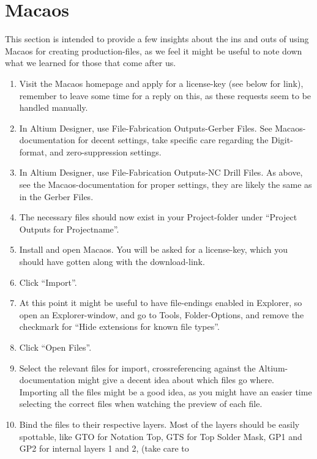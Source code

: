 \chapter{Macaos}\label{app:macaos}

This section is intended to provide a few insights about the ins and outs of
using Macaos for creating production-files, as we feel it might be useful to
note down what we learned for those that come after us. 

\begin {enumerate}
\item Visit the Macaos homepage and apply for a license-key (see below for
  link), remember to leave some time for a reply on this, as these requests seem
  to be handled manually.
\item In Altium Designer, use File-Fabrication Outputs-Gerber Files. See
  Macaos-documentation for decent settings, take specific care regarding the
  Digit-format, and zero-suppression settings.
\item In Altium Designer, use File-Fabrication Outputs-NC Drill Files. As above,
  see the Macaos-documentation for proper settings, they are likely the same as
  in the Gerber Files.
\item The necessary files should now exist in your Project-folder under
  ``Project Outputs for Projectname''.
\item Install and open Macaos. You will be asked for a license-key, which you
  should have gotten along with the download-link.
\item Click ``Import''.
\item At this point it might be useful to have file-endings enabled in
  Explorer, so open an Explorer-window, and go to Tools, Folder-Options, and
  remove the checkmark for ``Hide extensions for known file types''.
\item Click ``Open Files''.
\item Select the relevant files for import, crossreferencing against the
  Altium-documentation might give a decent idea about which files go where.
  Importing all the files might be a good idea, as you might have an easier time
  selecting the correct files when watching the preview of each file.
\item Bind the files to their respective layers. Most of the layers should be
  easily spottable, like GTO for Notation Top, GTS for Top Solder Mask, GP1 and
  GP2 for internal layers 1 and 2,  (take care to

\end{enumerate}
